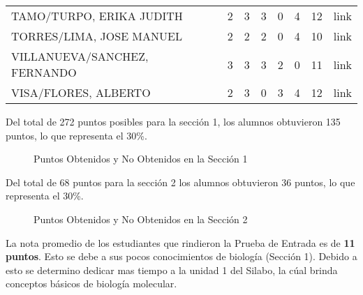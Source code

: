 \documentclass[11pt,fleqn]{book} %
\begin{document}
\begin{table}[]
\begin{tabular}{llllllll}
		TAMO/TURPO, ERIKA JUDITH            & 2           & 3           & 3           & 0           & 4           & 12            & link               \\
		TORRES/LIMA, JOSE MANUEL            & 2           & 2           & 2           & 0           & 4           & 10            & link               \\
		VILLANUEVA/SANCHEZ, FERNANDO & 3           & 3           & 3           & 2           & 0           & 11            & link               \\
		VISA/FLORES, ALBERTO                & 2           & 3           & 0           & 3           & 4           & 12            & link      \\
		\hline        
	\end{tabular}
\end{table}

\newpage

Del total de 272 puntos posibles para la sección 1, los alumnos obtuvieron 135 puntos, lo que representa el 30\%.

\begin{figure}[h]
\centering
{}
\caption{Puntos Obtenidos y No Obtenidos en la Sección 1}
\end{figure}

Del total de 68 puntos para la sección 2 los alumnos obtuvieron 36 puntos, lo que representa el 30\%.

\begin{figure}[h]
\centering
{}
\caption{Puntos Obtenidos y No Obtenidos en la Sección 2}
\end{figure}

La nota promedio de los estudiantes que rindieron la Prueba de Entrada es de \textbf{11 puntos}. Esto se debe a sus pocos conocimientos de biología (Sección 1). Debido a esto se determino dedicar mas tiempo a la unidad 1 del Silabo, la cúal brinda conceptos básicos de biología molecular.
\end{document}
